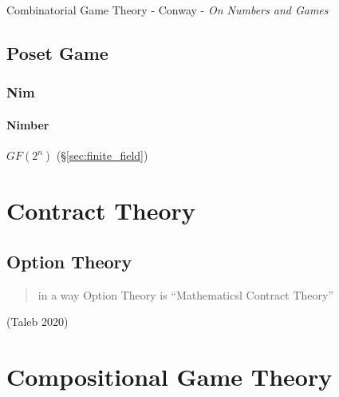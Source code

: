 Combinatorial Game Theory - Conway  - \emph{On Numbers and Games}



\subsection{Poset Game}\label{sec:poset_game}

\subsubsection{Nim}\label{sec:nim}

\paragraph{Nimber}\label{sec:nimber}\hfill

$GF(2^n)$ (\S\ref{sec:finite_field})



\section{Contract Theory}\label{sec:contract_theory}

\subsection{Option Theory}\label{sec:option_theory}

\begin{quote}
  in a way Option Theory is ``Mathematicsl Contract Theory''
\end{quote}
(Taleb 2020)



\section{Compositional Game Theory}\label{sec:compositional_game_theory}

